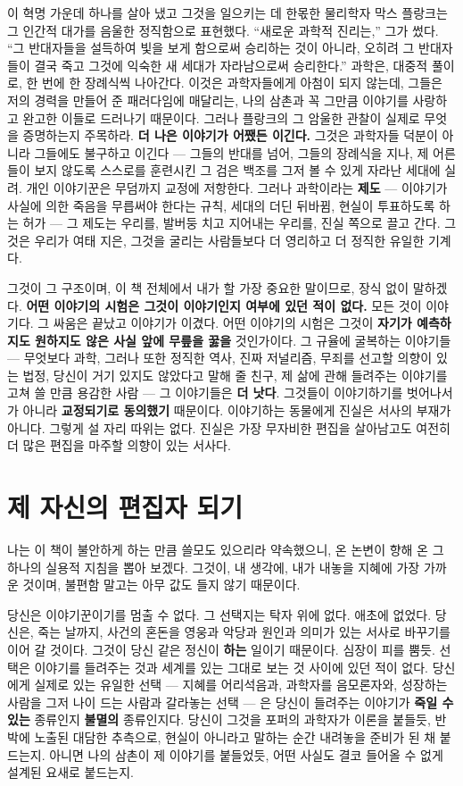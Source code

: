 이 혁명 가운데 하나를 살아 냈고 그것을 일으키는 데 한몫한 물리학자 막스 플랑크는 그 인간적 대가를 음울한 정직함으로 표현했다. ``새로운 과학적 진리는,'' 그가 썼다. ``그 반대자들을 설득하여 빛을 보게 함으로써 승리하는 것이 아니라, 오히려 그 반대자들이 결국 죽고 그것에 익숙한 새 세대가 자라남으로써 승리한다.'' 과학은, 대중적 풀이로, 한 번에 한 장례식씩 나아간다. 이것은 과학자들에게 아첨이 되지 않는데, 그들은 저의 경력을 만들어 준 패러다임에 매달리는, 나의 삼촌과 꼭 그만큼 이야기를 사랑하고 완고한 이들로 드러나기 때문이다. 그러나 플랑크의 그 암울한 관찰이 실제로 무엇을 증명하는지 주목하라. \textbf{더 나은 이야기가 어쨌든 이긴다.} 그것은 과학자들 덕분이 아니라 그들에도 불구하고 이긴다 — 그들의 반대를 넘어, 그들의 장례식을 지나, 제 어른들이 보지 않도록 스스로를 훈련시킨 그 검은 백조를 그저 볼 수 있게 자라난 세대에 실려. 개인 이야기꾼은 무덤까지 교정에 저항한다. 그러나 과학이라는 \textbf{제도} — 이야기가 사실에 의한 죽음을 무릅써야 한다는 규칙, 세대의 더딘 뒤바뀜, 현실이 투표하도록 하는 허가 — 그 제도는 우리를, 발버둥 치고 지어내는 우리를, 진실 쪽으로 끌고 간다. 그것은 우리가 여태 지은, 그것을 굴리는 사람들보다 더 영리하고 더 정직한 유일한 기계다.

그것이 그 구조이며, 이 책 전체에서 내가 할 가장 중요한 말이므로, 장식 없이 말하겠다. \textbf{어떤 이야기의 시험은 그것이 이야기인지 여부에 있던 적이 없다.} 모든 것이 이야기다. 그 싸움은 끝났고 이야기가 이겼다. 어떤 이야기의 시험은 그것이 \textbf{자기가 예측하지도 원하지도 않은 사실 앞에 무릎을 꿇을} 것인가이다. 그 규율에 굴복하는 이야기들 — 무엇보다 과학, 그러나 또한 정직한 역사, 진짜 저널리즘, 무죄를 선고할 의향이 있는 법정, 당신이 거기 있지도 않았다고 말해 줄 친구, 제 삶에 관해 들려주는 이야기를 고쳐 쓸 만큼 용감한 사람 — 그 이야기들은 \textbf{더 낫다}. 그것들이 이야기하기를 벗어나서가 아니라 \textbf{교정되기로 동의했기} 때문이다. 이야기하는 동물에게 진실은 서사의 부재가 아니다. 그렇게 설 자리 따위는 없다. 진실은 가장 무자비한 편집을 살아남고도 여전히 더 많은 편집을 마주할 의향이 있는 서사다.

\section*{제 자신의 편집자 되기}

나는 이 책이 불안하게 하는 만큼 쓸모도 있으리라 약속했으니, 온 논변이 향해 온 그 하나의 실용적 지침을 뽑아 보겠다. 그것이, 내 생각에, 내가 내놓을 지혜에 가장 가까운 것이며, 불편함 말고는 아무 값도 들지 않기 때문이다.

당신은 이야기꾼이기를 멈출 수 없다. 그 선택지는 탁자 위에 없다. 애초에 없었다. 당신은, 죽는 날까지, 사건의 혼돈을 영웅과 악당과 원인과 의미가 있는 서사로 바꾸기를 이어 갈 것이다. 그것이 당신 같은 정신이 \textbf{하는} 일이기 때문이다. 심장이 피를 뿜듯. 선택은 이야기를 들려주는 것과 세계를 있는 그대로 보는 것 사이에 있던 적이 없다. 당신에게 실제로 있는 유일한 선택 — 지혜를 어리석음과, 과학자를 음모론자와, 성장하는 사람을 그저 나이 드는 사람과 갈라놓는 선택 — 은 당신이 들려주는 이야기가 \textbf{죽일 수 있는} 종류인지 \textbf{불멸의} 종류인지다. 당신이 그것을 포퍼의 과학자가 이론을 붙들듯, 반박에 노출된 대담한 추측으로, 현실이 아니라고 말하는 순간 내려놓을 준비가 된 채 붙드는지. 아니면 나의 삼촌이 제 이야기를 붙들었듯, 어떤 사실도 결코 들어올 수 없게 설계된 요새로 붙드는지.

